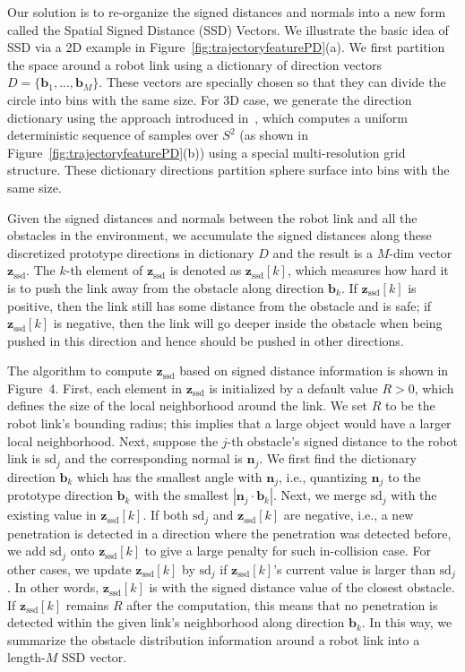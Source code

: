 \documentclass[letterpaper, 10 pt, conference]{ieeeconf}  %
\newcommand{\fssd}{\mbox{$\mathbf z_{\text{ssd}}$}}
\begin{document}
Our solution is to re-organize the signed distances and normals into a new form called the Spatial Signed Distance (SSD) Vectors. We illustrate the basic idea of SSD via a 2D example in Figure~\ref{fig:trajectoryfeaturePD}(a). We first partition the space around a robot link using a dictionary of direction vectors $D = \{\mathbf b_1, ..., \mathbf b_M\}$. These vectors are specially chosen so that they can divide the circle into bins with the same size. For 3D case, we generate the direction dictionary using the approach introduced in~\cite{Yershova:2010:GUI}, which computes a uniform deterministic sequence of samples over $S^2$ (as shown in Figure~\ref{fig:trajectoryfeaturePD}(b)) using a special multi-resolution grid structure. These dictionary directions partition sphere surface into bins with the same size.

Given the signed distances and normals between the robot link and all the obstacles in the environment, we accumulate the signed distances along these discretized prototype directions in dictionary $D$ and the result is a $M$-dim vector $\fssd$. The $k$-th element of $\fssd$ is denoted as $\fssd[k]$, which measures how hard it is to push the link away from the obstacle along direction $\mathbf b_k$. If $\fssd[k]$ is positive, then the link still has some distance from the obstacle and is safe; if $\fssd[k]$ is negative, then the link will go deeper inside the obstacle when being pushed in this direction and hence should be pushed in other directions. 


The algorithm to compute $\fssd$ based on signed distance information is shown in Figure~4. First, each element in $\fssd$ is initialized by a default value $R > 0$, which defines the size of the local neighborhood around the link. We set $R$ to be the robot link's bounding radius; this implies that a large object would have a larger local neighborhood. Next, suppose the $j$-th obstacle's signed distance to the robot link is $\text{sd}_j$ and the corresponding normal is $\mathbf n_j$. We first find the dictionary direction $\mathbf b_k$ which has the smallest angle with $\mathbf n_j$, i.e., quantizing $\mathbf n_j$ to the prototype direction $\mathbf b_k$ with the smallest $|\mathbf n_j \cdot \mathbf b_k|$. Next, we merge $\text{sd}_j$ with the existing value in $\fssd[k]$. If both $\text{sd}_j$ and $\fssd[k]$ are negative, i.e., a new penetration is detected in a direction where the penetration was detected before, we add $\text{sd}_j$ onto $\fssd[k]$ to give a large penalty for such in-collision case. For other cases, we update $\fssd[k]$ by $\text{sd}_j$ if $\fssd[k]$'s current value is larger than $\text{sd}_j$. In other words, $\fssd[k]$ is with the signed distance value of the closest obstacle. If $\fssd[k]$ remains $R$ after the computation, this means that no penetration is detected within the given link's neighborhood along direction $\mathbf b_k$. In this way, we summarize the obstacle distribution information around a robot link into a length-$M$ SSD vector.
\end{document}
